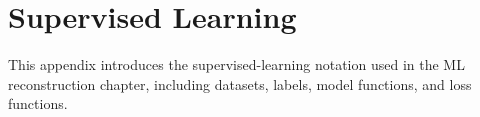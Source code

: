 \section{Supervised Learning}

This appendix introduces the supervised-learning notation used in the ML
reconstruction chapter, including datasets, labels, model functions, and loss
functions.
